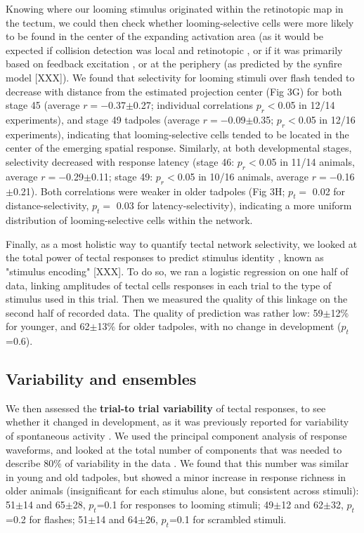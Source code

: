 \documentclass{article}
\begin{document}
Knowing where our looming stimulus originated within the retinotopic map in the tectum, we could then check whether looming-selective cells were more likely to be found in the center of the expanding activation area (as it would be expected if collision detection was local and retinotopic \citep{frost2004review}, or if it was primarily based on feedback excitation \citep{jang2016}, or at the periphery (as predicted by the synfire model [XXX]). We found that selectivity for looming stimuli over flash tended to decrease with distance from the estimated projection center (Fig 3G) for both stage 45 (average $r=-$0.37$\pm$0.27; individual correlations $p_r<$0.05 in 12/14 experiments), and stage 49 tadpoles (average $r=-$0.09$\pm$0.35; $p_r<$0.05 in 12/16 experiments), indicating that looming-selective cells tended to be located in the center of the emerging spatial response. Similarly, at both developmental stages, selectivity decreased with response latency (stage 46: $p_r<$0.05 in 11/14 animals, average $r=-$0.29$\pm$0.11; stage 49: $p_r<$0.05 in 10/16 animals, average $r=-$0.16$\pm$0.21). Both correlations were weaker in older tadpoles (Fig 3H; $p_t=$ 0.02 for distance-selectivity, $p_t=$ 0.03 for latency-selectivity), indicating a more uniform distribution of looming-selective cells within the network.

Finally, as a most holistic way to quantify tectal network selectivity, we looked at the total power of tectal responses to predict stimulus identity \citep{avitan2016limitations}, known as "stimulus encoding" [XXX]. To do so, we ran a logistic regression on one half of data, linking amplitudes of tectal cells responses in each trial to the type of stimulus used in this trial. Then we measured the quality of this linkage on the second half of recorded data. The quality of prediction was rather low: 59$\pm$12\% for younger, and 62$\pm$13\% for older tadpoles, with no change in development ($p_t$=0.6).

\subsection*{Variability and ensembles}

We then assessed the \textbf{trial-to trial variability} of tectal responses, to see whether it changed in development, as it was previously reported for variability of spontaneous activity \citep{xu2011,avitan2017spontaneous}. We used the principal component analysis of response waveforms, and looked at the total number of components that was needed to describe 80\% of variability in the data \citep{avitan2017spontaneous}. We found that this number was similar in young and old tadpoles, but showed a minor increase in response richness in older animals (insignificant for each stimulus alone, but consistent across stimuli): 51$\pm$14 and 65$\pm$28, $p_t$=0.1 for responses to looming stimuli; 49$\pm$12 and 62$\pm$32, $p_t$=0.2 for flashes; 51$\pm$14 and 64$\pm$26, $p_t$=0.1 for scrambled stimuli.
\end{document}
